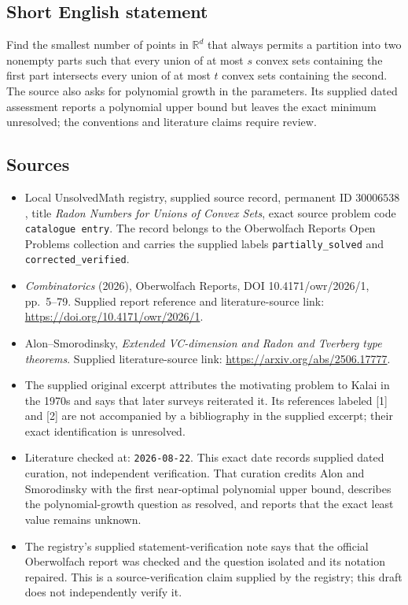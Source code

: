 \documentclass[11pt]{article}
\newcommand{\R}{\mathbb{R}}
\begin{document}
\subsection{Short English statement}
Find the smallest number of points in \(\R^d\) that always permits a partition into two nonempty parts such that every union of at most \(s\) convex sets containing the first part intersects every union of at most \(t\) convex sets containing the second. The source also asks for polynomial growth in the parameters. Its supplied dated assessment reports a polynomial upper bound but leaves the exact minimum unresolved; the conventions and literature claims require review.
\subsection{Sources}
\begin{itemize}
\item Local UnsolvedMath registry, supplied source record, permanent ID \(30006538\), title \emph{Radon Numbers for Unions of Convex Sets}, exact source problem code \texttt{catalogue entry}. The record belongs to the Oberwolfach Reports Open Problems collection and carries the supplied labels \texttt{partially\_solved} and \texttt{corrected\_verified}.
\item \emph{Combinatorics} (2026), Oberwolfach Reports, DOI 10.4171/owr/2026/1, pp.\ 5--79. Supplied report reference and literature-source link: \url{https://doi.org/10.4171/owr/2026/1}.
\item Alon--Smorodinsky, \emph{Extended VC-dimension and Radon and Tverberg type theorems}. Supplied literature-source link: \url{https://arxiv.org/abs/2506.17777}.
\item The supplied original excerpt attributes the motivating problem to Kalai in the 1970s and says that later surveys reiterated it. Its references labeled [1] and [2] are not accompanied by a bibliography in the supplied excerpt; their exact identification is unresolved.
\item Literature checked at: \texttt{2026-08-22}. This exact date records supplied dated curation, not independent verification. That curation credits Alon and Smorodinsky with the first near-optimal polynomial upper bound, describes the polynomial-growth question as resolved, and reports that the exact least value remains unknown.
\item The registry's supplied statement-verification note says that the official Oberwolfach report was checked and the question isolated and its notation repaired. This is a source-verification claim supplied by the registry; this draft does not independently verify it.
\end{itemize}
\end{document}
